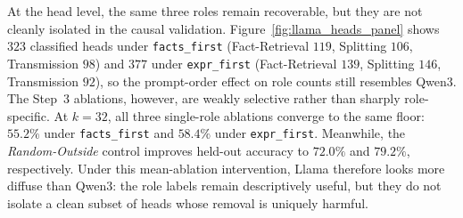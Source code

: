 \documentclass[11pt]{article}
\begin{document}
At the head level, the same three roles remain recoverable, but they are not cleanly isolated in the causal validation. Figure~\ref{fig:llama_heads_panel} shows $323$ classified heads under \texttt{facts\_first} (Fact-Retrieval $119$, Splitting $106$, Transmission $98$) and $377$ under \texttt{expr\_first} (Fact-Retrieval $139$, Splitting $146$, Transmission $92$), so the prompt-order effect on role counts still resembles Qwen3. The Step~3 ablations, however, are weakly selective rather than sharply role-specific. At $k=32$, all three single-role ablations converge to the same floor: $55.2\%$ under \texttt{facts\_first} and $58.4\%$ under \texttt{expr\_first}. Meanwhile, the \textit{Random-Outside} control improves held-out accuracy to $72.0\%$ and $79.2\%$, respectively. Under this mean-ablation intervention, Llama therefore looks more diffuse than Qwen3: the role labels remain descriptively useful, but they do not isolate a clean subset of heads whose removal is uniquely harmful.

%
%
%
%
%
%
\end{document}
